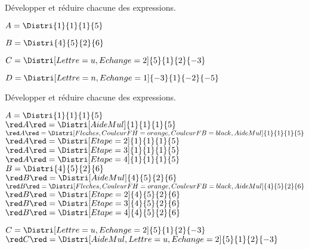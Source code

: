 \begin{exercice*}
    Développer et réduire chacune des expressions.
    \begin{itemize}
        \begin{spacing}{1.2}
            \item[] $A=\Distri{1}{1}{1}{5}$
	        \item[] $B=\Distri{4}{5}{2}{6}$
    	    \item[] $C=\Distri[Lettre=u,Echange=2]{5}{1}{2}{-3}$
	        \item[] $D=\Distri[Lettre=n,Echange=1]{-3}{1}{-2}{-5}$
        \end{spacing}
   \end{itemize}
\end{exercice*}
\begin{corrige}
    Développer et réduire chacune des expressions.

    \begin{itemize}
        \def\item{}
        \item $A=\Distri{1}{1}{1}{5}$\\        
        ${\red A}{\red = \Distri[AideMul]{1}{1}{1}{5}}$\\\bigskip        
        ${\red A}{\red =\Distri[Fleches,CouleurFH=orange,CouleurFB=black,AideMul]{1}{1}{1}{5}}$\\\bigskip
        ${\red A}{\red =\Distri[Etape=2]{1}{1}{1}{5}}$\\
        ${\red A}{\red =\Distri[Etape=3]{1}{1}{1}{5}}$\\
        ${\red A}{\red =\Distri[Etape=4]{1}{1}{1}{5}}$\\\bigskip
        \item $B=\Distri{4}{5}{2}{6}$\\        
        ${\red B}{\red = \Distri[AideMul]{4}{5}{2}{6}}$\\\bigskip        
        ${\red B}{\red =\Distri[Fleches,CouleurFH=orange,CouleurFB=black,AideMul]{4}{5}{2}{6}}$\\\bigskip
        ${\red B}{\red =\Distri[Etape=2]{4}{5}{2}{6}}$\\
        ${\red B}{\red =\Distri[Etape=3]{4}{5}{2}{6}}$\\
        ${\red B}{\red =\Distri[Etape=4]{4}{5}{2}{6}}$\\
    \end{itemize}
    \Coupe
    \begin{itemize}
        \def\item{}
        \item $C=\Distri[Lettre=u,Echange=2]{5}{1}{2}{-3}$\\
        ${\red C}{\red = \Distri[AideMul,Lettre=u,Echange=2]{5}{1}{2}{-3}}$


\end{itemize}
\end{corrige}
